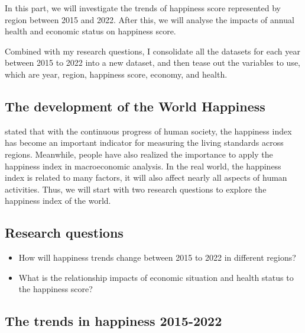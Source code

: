 \documentclass[11pt,a4paper,]{article}
\begin{document}
In this part, we will investigate the trends of happiness score represented by region between 2015 and 2022. After this, we will analyse the impacts of annual health and economic status on happiness score.

Combined with my research questions, I consolidate all the datasets for each year between 2015 to 2022 into a new dataset, and then tease out the variables to use, which are year, region, happiness score, economy, and health.

\hypertarget{the-development-of-the-world-happiness}{%
\subsection{The development of the World Happiness}\label{the-development-of-the-world-happiness}}

\textcite{helliwell2012state} stated that with the continuous progress of human society, the happiness index has become an important indicator for measuring the living standards across regions. Meanwhile, people have also realized the importance to apply the happiness index in macroeconomic analysis. In the real world, the happiness index is related to many factors, it will also affect nearly all aspects of human activities. Thus, we will start with two research questions to explore the happiness index of the world.

\hypertarget{research-questions-1}{%
\subsection{Research questions}\label{research-questions-1}}

\begin{itemize}
\item
  How will happiness trends change between 2015 to 2022 in different regions?
\item
  What is the relationship impacts of economic situation and health status to the happiness score?
\end{itemize}

\hypertarget{the-trends-in-happiness-2015-2022}{%
\subsection{The trends in happiness 2015-2022}\label{the-trends-in-happiness-2015-2022}}
\end{document}
